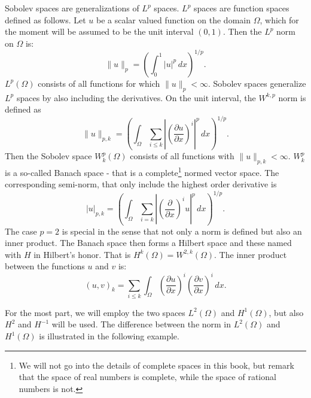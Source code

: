 Sobolev spaces are generalizations of $L^p$ spaces. $L^p$ spaces are function spaces defined as follows.  
Let $u$ be a scalar valued function on the domain $\Omega$, which for 
the moment will be assumed to be the unit interval $(0,1)$. Then the $L^p$ norm on $\Omega$ is:    
\[
\|u\|_p = (\int_0^1 |u|^p \, dx)^{1/p} .    
\]
$L^p(\Omega)$ consists of all functions for which $\|u\|_p < \infty$. 
Sobolev spaces generalize $L^p$ spaces by also including the derivatives.  
On the unit interval, the $W^{k,p}$ norm is defined as  
\begin{equation}
\label{Wpk}
\|u\|_{p,k} = (\int_\Omega \sum_{i \le k} |(\frac{\partial u}{\partial x})^i |^p \, dx)^{1/p} .    
\end{equation}
Then the Sobolev space $W^p_k(\Omega)$ consists of 
all functions with $\|u\|_{p,k} < \infty$. $W^p_k$ is a so-called Banach space - that is 
a complete\footnote{We will not go into the details of complete spaces in this book, but remark that
the space of real numbers is complete, while the space of rational numbers is not. } normed vector space. 
The corresponding semi-norm, that only include the highest order derivative is 
\begin{equation}
\label{semiWpk}
|u|_{p,k} = (\int_\Omega \sum_{i = k} |(\frac{\partial}{\partial x})^i   u|^p \, dx)^{1/p} .    
\end{equation}
The case $p=2$ is special in the sense that not only a norm is defined but also an inner product.    
The Banach space then forms a Hilbert space and these named with $H$ in Hilbert's honor. 
That is $H^k(\Omega) = W^{2,k}(\Omega)$. The inner product between the functions $u$ and $v$ is:  
\[
	(u, v)_{k} = \sum_{i \le k} \int_\Omega (\frac{\partial u}{\partial x})^i (\frac{\partial v}{\partial x})^i \,  dx.    
\]

For the most part, we will employ the two spaces $L^2(\Omega)$ and $H^1(\Omega)$, but also $H^2$ and $H^{-1}$ 
will be used. The difference between the norm in $L^2(\Omega)$ and $H^1(\Omega)$ is illustrated in the following example.   

